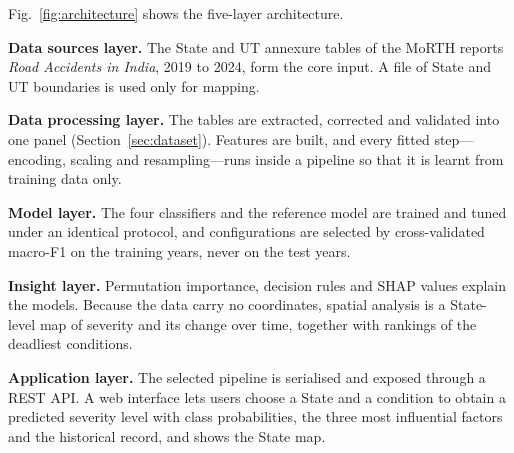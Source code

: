 \documentclass[conference]{IEEEtran}
\begin{document}
Fig.~\ref{fig:architecture} shows the five-layer architecture.

\textbf{Data sources layer.} The State and UT annexure tables of the MoRTH reports \emph{Road Accidents in India}, 2019 to 2024, form the core input. A file of State and UT boundaries is used only for mapping.

\textbf{Data processing layer.} The tables are extracted, corrected and validated into one panel (Section~\ref{sec:dataset}). Features are built, and every fitted step---encoding, scaling and resampling---runs inside a pipeline so that it is learnt from training data only.

\textbf{Model layer.} The four classifiers and the reference model are trained and tuned under an identical protocol, and configurations are selected by cross-validated macro-F1 on the training years, never on the test years.

\textbf{Insight layer.} Permutation importance, decision rules and SHAP values explain the models. Because the data carry no coordinates, spatial analysis is a State-level map of severity and its change over time, together with rankings of the deadliest conditions.

\textbf{Application layer.} The selected pipeline is serialised and exposed through a REST API. A web interface lets users choose a State and a condition to obtain a predicted severity level with class probabilities, the three most influential factors and the historical record, and shows the State map.
\end{document}
